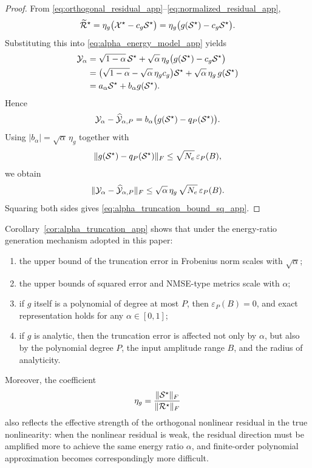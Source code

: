 \begin{proof}
From \eqref{eq:orthogonal_residual_app}--\eqref{eq:normalized_residual_app},
\begin{equation}
\widetilde{\mathcal{R}}^\star
=
\eta_g\bigl(\mathcal{X}^\star-c_g\mathcal{S}^\star\bigr)
=
\eta_g\bigl(g(\mathcal{S}^\star)-c_g\mathcal{S}^\star\bigr).
\end{equation}
Substituting this into \eqref{eq:alpha_energy_model_app} yields
\begin{align}
\mathcal{Y}_\alpha
&=
\sqrt{1-\alpha}\,\mathcal{S}^\star
+
\sqrt{\alpha}\,\eta_g\bigl(g(\mathcal{S}^\star)-c_g\mathcal{S}^\star\bigr) \\
&=
\bigl(\sqrt{1-\alpha}-\sqrt{\alpha}\,\eta_g c_g\bigr)\mathcal{S}^\star
+
\sqrt{\alpha}\,\eta_g\,g(\mathcal{S}^\star) \\
&=
a_\alpha \mathcal{S}^\star + b_\alpha g(\mathcal{S}^\star).
\end{align}
Hence
\begin{equation}
\mathcal{Y}_\alpha-\widehat{\mathcal{Y}}_{\alpha,P}
=
b_\alpha\bigl(g(\mathcal{S}^\star)-q_P(\mathcal{S}^\star)\bigr).
\end{equation}
Using $|b_\alpha|=\sqrt{\alpha}\,\eta_g$ together with
\begin{equation}
\|g(\mathcal{S}^\star)-q_P(\mathcal{S}^\star)\|_F
\le
\sqrt{N_e}\,\varepsilon_P(B),
\end{equation}
we obtain
\begin{equation}
\|\mathcal{Y}_\alpha-\widehat{\mathcal{Y}}_{\alpha,P}\|_F
\le
\sqrt{\alpha}\,\eta_g\,\sqrt{N_e}\,\varepsilon_P(B).
\end{equation}
Squaring both sides gives \eqref{eq:alpha_truncation_bound_sq_app}.
\end{proof}

\begin{remark}
Corollary~\ref{cor:alpha_truncation_app} shows that under the energy-ratio generation mechanism adopted in this paper:

\begin{enumerate}
    \item the upper bound of the truncation error in Frobenius norm scales with $\sqrt{\alpha}$;
    \item the upper bounds of squared error and NMSE-type metrics scale with $\alpha$;
    \item if $g$ itself is a polynomial of degree at most $P$, then $\varepsilon_P(B)=0$, and exact representation holds for any $\alpha\in[0,1]$;
    \item if $g$ is analytic, then the truncation error is affected not only by $\alpha$, but also by the polynomial degree $P$, the input amplitude range $B$, and the radius of analyticity.
\end{enumerate}

Moreover, the coefficient
\begin{equation}
\eta_g=\frac{\|\mathcal{S}^\star\|_F}{\|\mathcal{R}^\star\|_F}
\end{equation}
also reflects the effective strength of the orthogonal nonlinear residual in the true nonlinearity: when the nonlinear residual is weak, the residual direction must be amplified more to achieve the same energy ratio $\alpha$, and finite-order polynomial approximation becomes correspondingly more difficult.
\end{remark}

